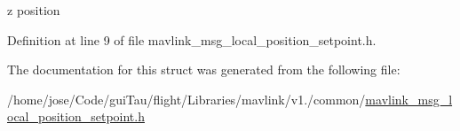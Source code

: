 z position 



Definition at line 9 of file mavlink\-\_\-msg\-\_\-local\-\_\-position\-\_\-setpoint.\-h.



The documentation for this struct was generated from the following file\-:\begin{DoxyCompactItemize}
\item 
/home/jose/\-Code/gui\-Tau/flight/\-Libraries/mavlink/v1./common/\hyperlink{mavlink__msg__local__position__setpoint_8h}{mavlink\-\_\-msg\-\_\-local\-\_\-position\-\_\-setpoint.\-h}\end{DoxyCompactItemize}

